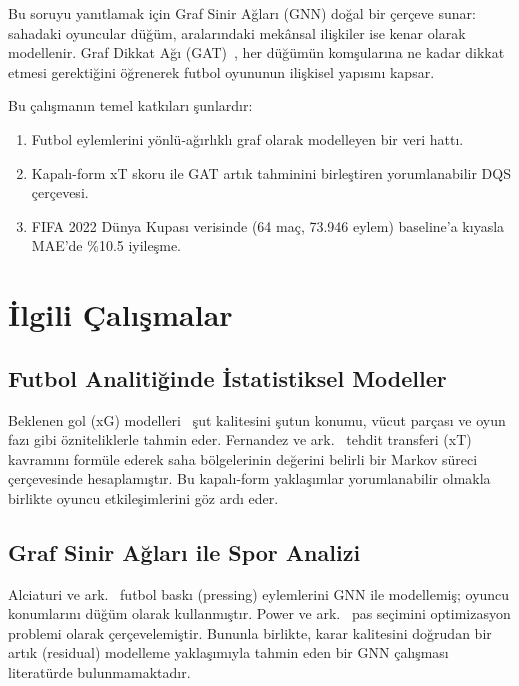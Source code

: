 \documentclass[conference]{IEEEtran}
\begin{document}
Bu soruyu yanıtlamak için Graf Sinir Ağları (GNN) doğal bir çerçeve sunar: sahadaki
oyuncular düğüm, aralarındaki mekânsal ilişkiler ise kenar olarak modellenir. Graf
Dikkat Ağı (GAT)~\cite{velickovic2018gat}, her düğümün komşularına ne kadar dikkat
etmesi gerektiğini öğrenerek futbol oyununun ilişkisel yapısını kapsar.

Bu çalışmanın temel katkıları şunlardır:
\begin{enumerate}
  \item Futbol eylemlerini yönlü-ağırlıklı graf olarak modelleyen bir veri hattı.
  \item Kapalı-form xT skoru ile GAT artık tahminini birleştiren yorumlanabilir DQS
  çerçevesi.
  \item FIFA 2022 Dünya Kupası verisinde (64 maç, 73.946 eylem) baseline'a kıyasla
  MAE'de \%10.5 iyileşme.
\end{enumerate}

\section{İlgili Çalışmalar}

\subsection{Futbol Analitiğinde İstatistiksel Modeller}

Beklenen gol (xG) modelleri~\cite{rathke2017expected} şut kalitesini şutun konumu,
vücut parçası ve oyun fazı gibi özniteliklerle tahmin eder. Fernandez ve ark.~\cite{fernandez2019decomposing}
tehdit transferi (xT) kavramını formüle ederek saha bölgelerinin değerini belirli bir
Markov süreci çerçevesinde hesaplamıştır. Bu kapalı-form yaklaşımlar yorumlanabilir
olmakla birlikte oyuncu etkileşimlerini göz ardı eder.

\subsection{Graf Sinir Ağları ile Spor Analizi}

Alciaturi ve ark.~\cite{alciaturi2023graph} futbol baskı (pressing) eylemlerini GNN
ile modellemiş; oyuncu konumlarını düğüm olarak kullanmıştır. Power ve ark.~\cite{power2017optimising}
pas seçimini optimizasyon problemi olarak çerçevelemiştir. Bununla birlikte, karar
kalitesini doğrudan bir artık (residual) modelleme yaklaşımıyla tahmin eden bir GNN
çalışması literatürde bulunmamaktadır.
\end{document}
